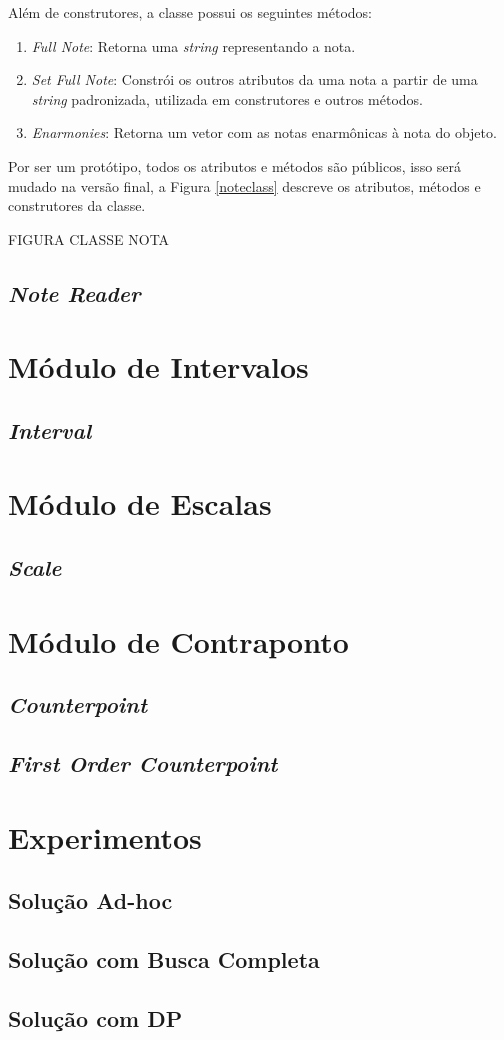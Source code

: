       Além de construtores, a classe possui os seguintes métodos:

      \begin{enumerate}
        \item \textit{Full Note}: Retorna uma \textit{string} representando a nota.
        \item \textit{Set Full Note}: Constrói os outros atributos da uma nota a partir de uma \textit{string} padronizada, utilizada em construtores e outros métodos.
        \item \textit{Enarmonies}: Retorna um vetor com as notas enarmônicas à nota do objeto.
      \end{enumerate}

      Por ser um protótipo, todos os atributos e métodos são públicos, isso será mudado na versão final, a Figura \ref{noteclass} descreve os atributos, métodos e construtores da classe.

      FIGURA CLASSE NOTA

    \subsection[\textit{Note Reader}]{\textit{Note Reader}}
  \section[Módulo de Intervalos]{Módulo de Intervalos}
    \subsection[\textit{Interval}]{\textit{Interval}}
  \section[Módulo de Escalas]{Módulo de Escalas}
    \subsection[\textit{Scale}]{\textit{Scale}}
  \section[Módulo de Contraponto]{Módulo de Contraponto}
    \subsection[\textit{Counterpoint}]{\textit{Counterpoint}}
    \subsection[\textit{First Order Counterpoint}]{\textit{First Order Counterpoint}}

  \section[Experimentos]{Experimentos}
  \subsection[\textit{Solução Ad-hoc}]{Solução Ad-hoc}
  \subsection[\textit{Solução com Busca Completa}]{Solução com Busca Completa}
    \subsection[\textit{Solução com DP}]{Solução com DP}
